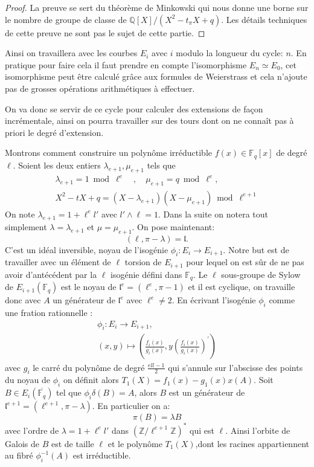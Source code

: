 \documentclass[10pt,a4paper]{book}
\theoremstyle{plain}
\theoremstyle{definition}
\theoremstyle{definition}
\theoremstyle{definition}
\theoremstyle{definition}
\theoremstyle{remark}
\theoremstyle{remark}
\begin{document}
\begin{proof}
La preuve se sert du théorème de Minkowski qui nous donne une borne sur le nombre de groupe de classe de $\mathbb{Q}[X]/(X^2-t_{\pi}X+q)$. Les détails techniques de cette preuve ne sont pas le sujet de cette partie.
\end{proof}

Ainsi on travaillera avec les courbes $E_i$ avec $i$ modulo la longueur du cycle: $n$. En pratique pour faire cela il faut prendre en compte l'isomorphisme $E_n \simeq E_0$, cet isomorphisme peut être calculé grâce aux formules de Weierstrass et cela n'ajoute pas de grosses opérations arithmétiques à effectuer.

On va donc se servir de ce cycle pour calculer des extensions de façon incrémentale, ainsi on pourra travailler sur des tours dont on ne connaît pas à priori le degré d'extension. 

Montrons comment construire un polynôme irréductible $f(x) \in \mathbb{F}_q[x]$ de degré $\ell$. Soient  les deux entiers $\lambda_{e+1}, \mu_{e+1}$ tels que 
\begin{align*}
\lambda_{e+1}=1 \bmod \ell^{e} \quad , \quad \mu_{e+1}=q \bmod \ell^e, \\
X^2-tX+q = (X-\lambda_{e+1})(X-\mu_{e+1}) \bmod \ell^{e+1} 
\end{align*}
On note $\lambda_{e+1}=1+\ell^el'$ avec $l' \wedge \ell = 1$. Dans la suite on notera tout simplement $\lambda=\lambda_{e+1}$ et $\mu = \mu_{e+1}$. On pose maintenant:
\begin{equation*}
(\ell,\pi-\lambda)=\mathfrak{l}.
\end{equation*}
C'est un idéal inversible, noyau de l'isogénie $\phi_{i}:E_i \to E_{i+1}$. Notre but est de travailler avec un élément de $\ell$ torsion de $E_{i+1}$ pour lequel on est sûr de ne pas avoir d'antécédent par la $\ell$ isogénie défini dans $\mathbb{F}_q$. Le $\ell$ sous-groupe de Sylow de $E_{i+1}(\mathbb{F}_q)$ est le noyau de $\mathfrak{l}^e=(\ell^e,\pi - 1)$ et il est cyclique, on travaille donc avec $A$ un générateur de $\mathfrak{l}^e$ avec $\ell^e \neq 2$. En écrivant l'isogénie $\phi_i$ comme une fration rationnelle : 
\begin{align*}
\phi_{i}:E_i \to E_{i+1}, \\
(x,y) \mapsto \left( \frac{f_i(x)}{g_i(x)},y\left( \frac{f_i(x)}{g_i(x)} \right)^' \right)
\end{align*}
avec $g_i$ le carré du polynôme de degré $\frac{ell-1}{2}$  qui s'annule sur l'abscisse des points du noyau de $\phi_{i}$ on  définit alors $ T_{1}(X)=f_{1}(x)-g_{1}(x)x(A)$. Soit $B \in E_i(\overline{\mathbb{F}_q})$ tel que $\phi_i{\delta}(B)=A$, alors  $B$ est un générateur de $\mathfrak{l}^{e+1}=(\ell^{e+1},\pi-\lambda)$. En particulier on a:
\begin{equation*}
\pi(B)=\lambda B
\end{equation*}
avec l'ordre de $\lambda=1+\ell^el'$ dans $(\mathbb{Z}/\ell^{e+1}\mathbb{Z})^*$ qui est $\ell$. Ainsi l'orbite de Galois de $B$ est de taille $\ell$ et le polynôme $T_{1}(X)$,dont les racines appartiennent au fibré $\phi_i^{-1}(A)$ est irréductible. 
\end{document}
